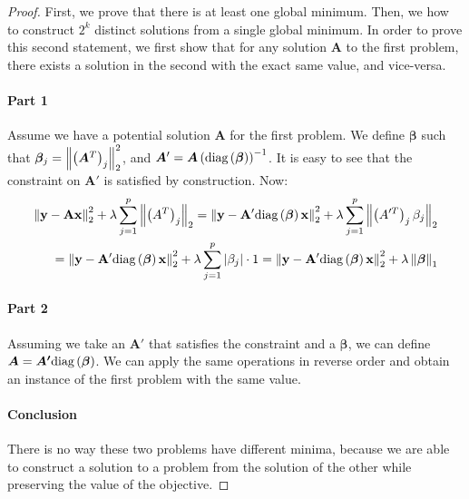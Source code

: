 \begin{proof}
  First, we prove that there is at least one global minimum. Then, we 
    how to construct $2^k$ distinct solutions from a single global
  minimum.
  In order to prove this second statement, we first show that for any solution $\bm{A}$ to the first problem, there exists a solution in the second with the exact same value, and vice-versa.
  \vspace{-0.15in}
  \paragraph{Part 1} Assume we have a potential solution $\bm{A}$ for the first problem.  We define $\bm{\beta}$ such that $\bm{\beta}_j = \left\lVert\left(\bm{A}^T\right)_j\right\rVert_2^2$, and $\bm{A}' = \bm{A}\left(\text{diag}\left(\bm{\beta}\right)\right)^{-1}$. It is easy to see that the constraint on $\bm{A}'$ is satisfied by construction. Now:
  \vspace{-0.10in}
  \begin{equation*}
    \begin{aligned}
     \left\lVert\bf{y} - \bf{A}\bf{x}\right\rVert_2^2 + \lambda \sum_{j=1}^p \left\lVert\left(A^T\right)_j\right\rVert_2 
    = \left\lVert\bf{y} - \bf{A'}\text{diag}\left(\bm{\beta}\right)\bf{x}\right\rVert_2^2 + \lambda \sum_{j=1}^p \left\lVert\left(A'^T\right)_j\beta_j\right\rVert_2 \\
     = \left\lVert\bf{y} - \bf{A'}\text{diag}\left(\bm{\beta}\right)\bf{x}\right\rVert_2^2 + \lambda \sum_{j=1}^p \left|\beta_j\right| \cdot 1
    = \left\lVert\bf{y} - \bf{A'}\text{diag}\left(\bm{\beta}\right)\bf{x}\right\rVert_2^2 + \lambda \left\lVert\bm{\beta}\right\rVert_1
\end{aligned}
  \end{equation*}
  \vspace{-0.25in}
  \paragraph{Part 2} Assuming we take an $\bm{A}'$ that satisfies the constraint and a $\bm{\beta}$, we can define $\bm{A} = \bm{A'}\text{diag}\left(\bm{\beta}\right)$. We can apply the same operations in reverse order and obtain an instance of the first problem with the same value.
  \vspace{-0.15in}
  \paragraph{Conclusion} There is no way these two problems have different minima,
  because we are able to construct a solution to a problem from the solution
  of the other while preserving the value of the objective.
\end{proof}

